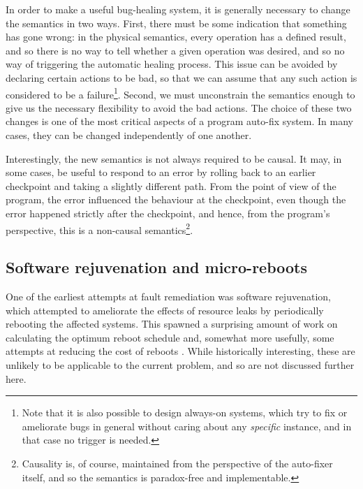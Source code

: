 In order to make a useful bug-healing system, it is generally
necessary to change the semantics in two ways.  First, there must be
some indication that something has gone wrong: in the physical
semantics, every operation has a defined result, and so there is no
way to tell whether a given operation was desired, and so no way of
triggering the automatic healing process.  This issue can be avoided
by declaring certain actions to be bad, so that we can assume that any
such action is considered to be a failure\footnote{Note that it is
  also possible to design always-on systems, which try to fix or
  ameliorate bugs in general without caring about any \emph{specific}
  instance, and in that case no trigger is needed.}.  Second, we must
unconstrain the semantics enough to give us the necessary flexibility
to avoid the bad actions.  The choice of these two changes is one of
the most critical aspects of a program auto-fix system.  In many
cases, they can be changed independently of one another.

Interestingly, the new semantics is not always required to be causal.
It may, in some cases, be useful to respond to an error by rolling
back to an earlier checkpoint and taking a slightly different path.
From the point of view of the program, the error influenced the
behaviour at the checkpoint, even though the error happened strictly
after the checkpoint, and hence, from the program's perspective, this
is a non-causal semantics\footnote{Causality is, of course, maintained
  from the perspective of the auto-fixer itself, and so the semantics
  is paradox-free and implementable.}.

\subsection{Software rejuvenation and micro-reboots}

One of the earliest attempts at fault remediation was software
rejuvenation\cite{Huang1995}, which attempted to ameliorate the
effects of resource leaks by periodically rebooting the affected
systems.  This spawned a surprising amount of work on calculating the
optimum reboot schedule
\cite{Li2002,Vaidyanathan1999,Vaidyanathan2001,Trivedi2000,Garg1998,Garg1995,Garg1998a,Castelli2001}
and, somewhat more usefully, some attempts at reducing the cost of
reboots \cite{Candea2002,Candea2001,Candea,Patterson2002}.  While
historically interesting, these are unlikely to be applicable to the
current problem, and so are not discussed further here.

